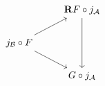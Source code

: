 \documentclass[12pt]{standalone}
\begin{document}
        $$

\begin{tikzcd}
    & \mathbf{R}F \circ j_{\mathcal A} \ar[dd] \\
    j_{\mathcal B} \circ F \ar[ru] \ar[rd] & \\
    & G \circ j_{\mathcal A}
\end{tikzcd}
        $$
        
\end{document}
